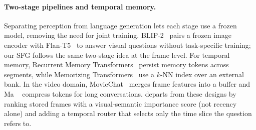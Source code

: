 \paragraph{Two-stage pipelines and temporal memory.}
Separating perception from language generation lets each stage use a frozen model, removing the need for joint training.
BLIP-2~\cite{li2023blip2} pairs a frozen image encoder with Flan-T5~\cite{chung2022flanT5} to answer visual questions without task-specific training; our SFG follows the same two-stage idea at the frame level.
For temporal memory, Recurrent Memory Transformers~\cite{bulatov2022recurrent} persist memory tokens across segments, while Memorizing Transformers~\cite{wu2022memorizing} use a $k$-NN index over an external bank.
In the video domain, MovieChat~\cite{song2024moviechat} merges frame features into a buffer and Ma \etal~\cite{ma2023livelylivechat} compress tokens for long conversations.
\ours departs from these designs by ranking stored frames with a visual-semantic importance score (not recency alone) and adding a temporal router that selects only the time slice the question refers to.

